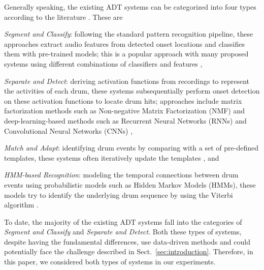 \documentclass{article}
\begin{document}
Generally speaking, the existing ADT systems can be categorized into four types according to the literature \cite{Gillet2008_taslp, Paulus09_DrumStructure_PhD}. These are
\begin{inparaenum}[(i)]
	\item \textit{Segment and Classify}: following the standard pattern recognition pipeline, these approaches extract audio features from detected onset locations and classifies them with pre-trained models; this is a popular approach with many proposed systems using different combinations of classifiers and features \cite{SteelantTDBLM05_DrumTransSVM_Chapter, Gillet2008_taslp, SouzaBN15_CymbalClassi_IJCNN, Gajhede2016},
	\item \textit{Separate and Detect}: deriving activation functions from recordings to represent the activities of each drum, these systems subsequentially perform onset detection on these activation functions to locate drum hits; approaches include matrix factorization methods such as Non-negative Matrix Factorization (NMF) \cite{DittmarG14_DrumTranscription_DAFX, Roebel2015, Wu2015_ismir} and deep-learning-based methods such as Recurrent Neural Networks (RNNs) \cite{Southall2016, Vogl2016, Vogl2017_icassp} and Convolutional Neural Networks (CNNs) \cite{Southall2017, Vogl2017_ismir},
	\item \textit{Match and Adapt}: identifying drum events by comparing with a set of pre-defined templates, these systems often iteratively update the templates \cite{YoshiiGO07_DrumTrans_IEEE-TASLP}, and
	\item \textit{HMM-based Recognition}: modeling the temporal connections between drum events using probabilistic models such as Hidden Markov Models (HMMs), these models try to identify the underlying drum sequence by using the Viterbi algorithm \cite{PaulusK09_DrumTransHMM_JASMP, Dzhambazov14_DrumTransHMM_AES}. 
\end{inparaenum} 

To date, the majority of the existing ADT systems fall into the categories of \textit{Segment and Classify} and \textit{Separate and Detect}. Both these types of systems, despite having the fundamental differences, use data-driven methods and could potentially face the challenge described in Sect.~\ref{sec:introduction}.
Therefore, in this paper, we considered both types of systems in our experiments.
\end{document}

